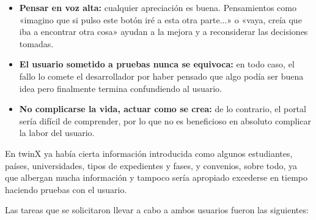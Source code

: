 \begin{itemize}
	\item \textbf{Pensar en voz alta:} cualquier apreciación es buena. Pensamientos como «imagino que si pulso este botón iré a esta otra parte...» o «vaya, creía que iba a encontrar otra cosa» ayudan a la mejora y a reconsiderar las decisiones tomadas.
	\item \textbf{El usuario sometido a pruebas nunca se equivoca:} en todo caso, el fallo lo comete el desarrollador por haber pensado que algo podía ser buena idea pero finalmente termina confundiendo al usuario.
	\item \textbf{No complicarse la vida, actuar como se crea:} de lo contrario, el portal sería difícil de comprender, por lo que no es beneficioso en absoluto complicar la labor del usuario.	
\end{itemize}

En twinX ya había cierta información introducida como algunos estudiantes, países, universidades, tipos de expedientes y fases, y convenios, sobre todo, ya que albergan mucha información y tampoco sería apropiado excederse en tiempo haciendo pruebas con el usuario.

Las tareas que se solicitaron llevar a cabo a ambos usuarios fueron las siguientes:


